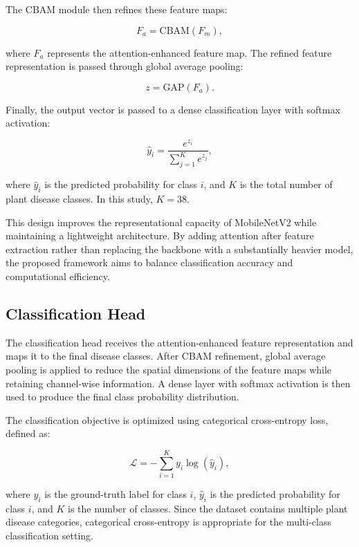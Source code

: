 The CBAM module then refines these feature maps:

\begin{equation}
    F_a = \text{CBAM}(F_m),
\end{equation}

where $F_a$ represents the attention-enhanced feature map. The refined feature representation is passed through global average pooling:

\begin{equation}
    z = \text{GAP}(F_a).
\end{equation}

Finally, the output vector is passed to a dense classification layer with softmax activation:

\begin{equation}
    \hat{y}_i = \frac{e^{z_i}}{\sum_{j=1}^{K} e^{z_j}},
\end{equation}

where $\hat{y}_i$ is the predicted probability for class $i$, and $K$ is the total number of plant disease classes. In this study, $K=38$.

This design improves the representational capacity of MobileNetV2 while maintaining a lightweight architecture. By adding attention after feature extraction rather than replacing the backbone with a substantially heavier model, the proposed framework aims to balance classification accuracy and computational efficiency.

\subsection{Classification Head}

The classification head receives the attention-enhanced feature representation and maps it to the final disease classes. After CBAM refinement, global average pooling is applied to reduce the spatial dimensions of the feature maps while retaining channel-wise information. A dense layer with softmax activation is then used to produce the final class probability distribution.

The classification objective is optimized using categorical cross-entropy loss, defined as:

\begin{equation}
    \mathcal{L} = - \sum_{i=1}^{K} y_i \log(\hat{y}_i),
\end{equation}

where $y_i$ is the ground-truth label for class $i$, $\hat{y}_i$ is the predicted probability for class $i$, and $K$ is the number of classes. Since the dataset contains multiple plant disease categories, categorical cross-entropy is appropriate for the multi-class classification setting.


